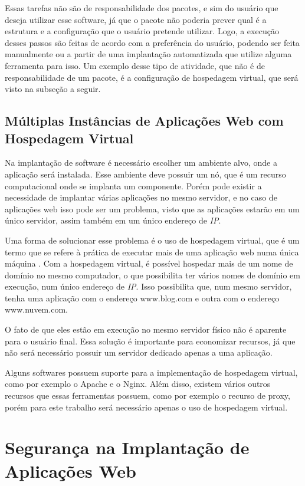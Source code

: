 Essas tarefas não são de responsabilidade dos pacotes, e sim do usuário que deseja utilizar esse
software, já que o pacote não poderia prever qual é a estrutura e a configuração
que o usuário pretende utilizar. Logo, a execução desses passos são feitas de
acordo com a preferência do usuário, podendo ser feita manualmente ou a partir
de uma implantação automatizada que utilize alguma ferramenta para isso. Um exemplo
desse tipo de atividade, que não é de responsabilidade de um pacote, é a configuração
de hospedagem virtual, que será visto na subseção a seguir.

\subsection{Múltiplas Instâncias de Aplicações Web com Hospedagem Virtual}

Na implantação de software é necessário escolher um ambiente alvo, onde a aplicação
será instalada. Esse ambiente deve possuir um nó, que é um recurso computacional
onde se implanta um componente. Porém pode
existir a necessidade de implantar várias aplicações no mesmo servidor, e no caso
de aplicações web isso pode ser um problema, visto que as aplicações estarão em um
único servidor, assim também em um único endereço de \textit{IP}.

Uma forma de solucionar esse problema é o uso de hospedagem virtual, que é um 
termo que se refere à prática de executar mais de uma aplicação web numa única 
máquina \cite{apachvh}. Com a hospedagem virtual, é possível
hospedar mais de um nome de domínio no mesmo computador, o que possibilita ter
vários nomes de domínio em execução, num único endereço de \textit{IP}. Isso
possibilita que, num mesmo servidor, tenha uma aplicação com o endereço
 www.blog.com e outra com o endereço www.nuvem.com. 

O fato de que eles estão em execução no mesmo servidor físico não é aparente 
para o usuário final. Essa solução é importante para economizar recursos, 
já que não será necessário possuir um servidor dedicado apenas a uma aplicação.

Alguns softwares possuem suporte para a implementação de hospedagem virtual, como por
exemplo o Apache e o Nginx. Além disso, existem vários
outros recursos que essas ferramentas possuem, como por exemplo o recurso de proxy,
porém para este trabalho será necessário apenas o uso de hospedagem virtual.

\section{Segurança na Implantação de Aplicações Web}
\label{sec:seguranca}

